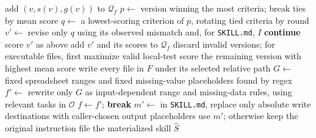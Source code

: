 \begin{algorithm*}[t]
\begin{algorithmic}[1]
    \State add $(v,s(v),g(v))$ to $\mathcal{Q}_f$
  \EndFor
    \State $p\gets$ version winning the most criteria; break ties by mean score
    \State $q\gets$ a lowest-scoring criterion of $p$, rotating tied criteria by round
    \State $v'\gets$ revise only $q$ using its observed mismatch and, for \texttt{SKILL.md}, $I$
     \State \textbf{continue} \EndIf
    \State score $v'$ as above
      \State add $v'$ and its scores to $\mathcal{Q}_f$
    \EndIf
  \EndFor
  \State discard invalid versions; for executable files, first maximize valid local-test score
  \State \Return the remaining version with highest mean score
\EndProcedure
\Statex
{} 
  \State write every file in $F$ under its selected relative path
    \State $G\gets$ fixed spreadsheet ranges and fixed missing-value placeholders found by regex
      \State $f'\gets$ rewrite only $G$ as input-dependent range and missing-data rules, using relevant tasks in $\mathcal{O}$
        \State $f\gets f'$; \textbf{break}
      \EndIf
    \EndFor
  \EndFor
  \State $m'\gets$ in \texttt{SKILL.md}, replace only absolute write destinations
         with caller-chosen output placeholders
    \State use $m'$; otherwise keep the original instruction file
  \EndIf
  \State \Return the materialized skill $\widehat{S}$
\EndProcedure
\end{algorithmic}
\end{algorithm*}

\clearpage
